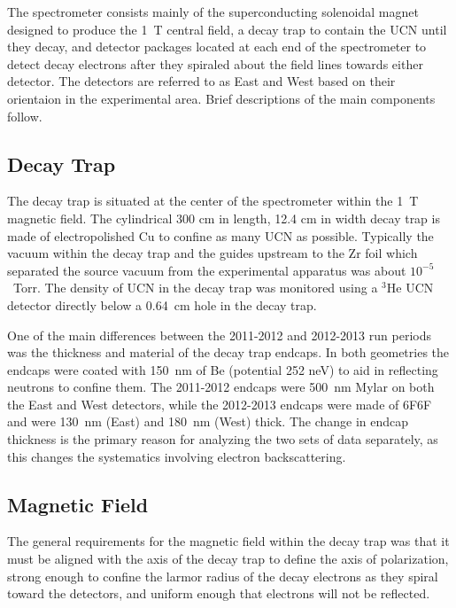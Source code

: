 The spectrometer consists mainly of the superconducting solenoidal magnet designed to produce
the 1~T central field, a decay trap to contain the UCN until they decay, and detector
packages located at each end of the spectrometer to detect decay electrons after they spiraled
about the field lines towards either detector. The detectors are referred to as
East and West based on their orientaion in the experimental area.
Brief descriptions of the main components follow.

\subsection{Decay Trap}
The decay trap is situated at the center of the spectrometer within the 1~T magnetic
field. The cylindrical 300 cm in length, 12.4 cm in width decay trap is made of electropolished Cu
to confine as many UCN as possible. Typically the vacuum within the decay trap and the guides
upstream to the Zr foil which separated the source vacuum from the experimental apparatus was about
$10^{-5}$~Torr. The density of UCN in the decay trap was monitored using a $^3\mathrm{He}$ UCN detector
directly below a 0.64~cm hole in the decay trap.

One of the main differences between the 2011-2012 and 2012-2013 run periods was the thickness and
material of the decay trap endcaps. In both geometries the endcaps were coated with 150~nm of
Be (potential 252 neV) to aid in reflecting neutrons to confine them. The 2011-2012 endcaps
were 500~nm Mylar on both the East and West detectors, while the 2012-2013 endcaps were made of 6F6F
\cite{hoedl2003} and were 130~nm (East) and 180~nm (West) thick. The change in endcap thickness
is the primary reason for analyzing the two sets of data separately, as this changes the
systematics involving electron backscattering. 

\subsection{Magnetic Field} \label{ssec:MagneticField}

The general requirements for the magnetic field within the decay trap was that it must be aligned with
the axis of the decay trap to define the axis of polarization, strong enough to confine the larmor
radius of the decay electrons as they spiral toward the detectors, and uniform enough that
electrons will not be reflected.

